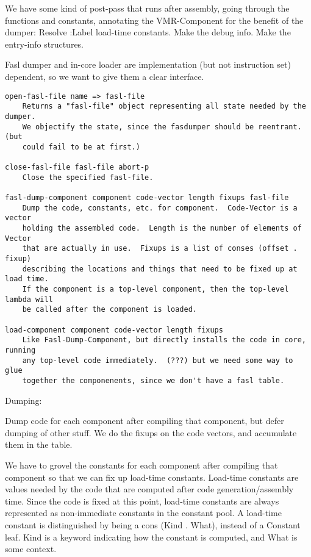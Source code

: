 We have some kind of post-pass that runs after assembly, going through the
functions and constants, annotating the VMR-Component for the benefit of the
dumper:
    Resolve :Label load-time constants.
    Make the debug info.
    Make the entry-info structures.

Fasl dumper and in-core loader are implementation (but not instruction set)
dependent, so we want to give them a clear interface.

\begin{verbatim}
open-fasl-file name => fasl-file
    Returns a "fasl-file" object representing all state needed by the dumper.
    We objectify the state, since the fasdumper should be reentrant.  (but
    could fail to be at first.)

close-fasl-file fasl-file abort-p
    Close the specified fasl-file.

fasl-dump-component component code-vector length fixups fasl-file
    Dump the code, constants, etc. for component.  Code-Vector is a vector
    holding the assembled code.  Length is the number of elements of Vector
    that are actually in use.  Fixups is a list of conses (offset . fixup)
    describing the locations and things that need to be fixed up at load time.
    If the component is a top-level component, then the top-level lambda will
    be called after the component is loaded.

load-component component code-vector length fixups
    Like Fasl-Dump-Component, but directly installs the code in core, running
    any top-level code immediately.  (???) but we need some way to glue
    together the componenents, since we don't have a fasl table.
\end{verbatim}



Dumping:

Dump code for each component after compiling that component, but defer dumping
of other stuff.  We do the fixups on the code vectors, and accumulate them in
the table.

We have to grovel the constants for each component after compiling that
component so that we can fix up load-time constants.  Load-time constants are
values needed by the code that are computed after code generation/assembly
time.  Since the code is fixed at this point, load-time constants are always
represented as non-immediate constants in the constant pool.  A load-time
constant is distinguished by being a cons (Kind . What), instead of a Constant
leaf.  Kind is a keyword indicating how the constant is computed, and What is
some context.

